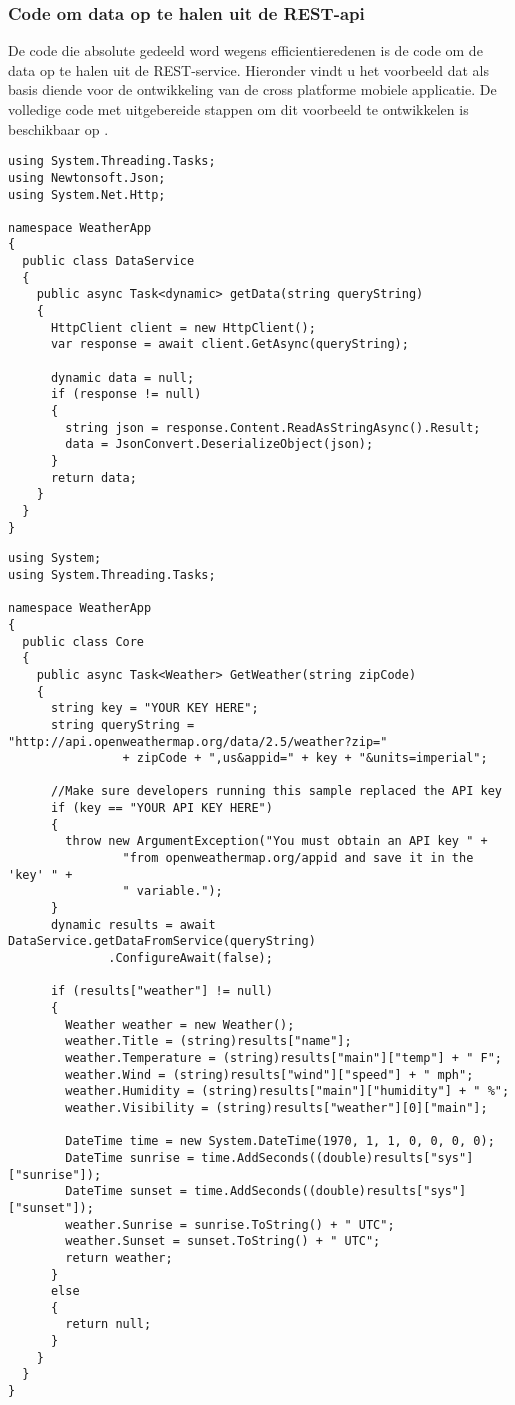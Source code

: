 \subsubsection{Code om data op te halen uit de REST-api}
De code die absolute gedeeld word wegens efficientieredenen is de code om de data op te halen uit de REST-service.
Hieronder vindt u het voorbeeld dat als basis diende voor de ontwikkeling van de cross platforme mobiele applicatie.
De volledige code met uitgebereide stappen om dit voorbeeld te ontwikkelen is beschikbaar op \citep{buildappwithnativeuiusingxamarininvisualstudio}.

\begin{lstlisting}
using System.Threading.Tasks;
using Newtonsoft.Json;
using System.Net.Http;

namespace WeatherApp
{
  public class DataService
  {
    public async Task<dynamic> getData(string queryString)
    {
      HttpClient client = new HttpClient();
      var response = await client.GetAsync(queryString);

      dynamic data = null;
      if (response != null)
      {
        string json = response.Content.ReadAsStringAsync().Result;
        data = JsonConvert.DeserializeObject(json);
      }
      return data;
    }
  }
}

\end{lstlisting}
\begin{lstlisting}
using System;
using System.Threading.Tasks;

namespace WeatherApp
{
  public class Core
  {
    public async Task<Weather> GetWeather(string zipCode)
    {
      string key = "YOUR KEY HERE";
      string queryString = "http://api.openweathermap.org/data/2.5/weather?zip="
                + zipCode + ",us&appid=" + key + "&units=imperial";

      //Make sure developers running this sample replaced the API key
      if (key == "YOUR API KEY HERE")
      {
        throw new ArgumentException("You must obtain an API key " +
                "from openweathermap.org/appid and save it in the 'key' " +
                " variable.");
      }
      dynamic results = await DataService.getDataFromService(queryString)
              .ConfigureAwait(false);

      if (results["weather"] != null)
      {
        Weather weather = new Weather();
        weather.Title = (string)results["name"];
        weather.Temperature = (string)results["main"]["temp"] + " F";
        weather.Wind = (string)results["wind"]["speed"] + " mph";
        weather.Humidity = (string)results["main"]["humidity"] + " %";
        weather.Visibility = (string)results["weather"][0]["main"];

        DateTime time = new System.DateTime(1970, 1, 1, 0, 0, 0, 0);
        DateTime sunrise = time.AddSeconds((double)results["sys"]["sunrise"]);
        DateTime sunset = time.AddSeconds((double)results["sys"]["sunset"]);
        weather.Sunrise = sunrise.ToString() + " UTC";
        weather.Sunset = sunset.ToString() + " UTC";
        return weather;
      }
      else
      {
        return null;
      }
    }
  }
}
\end{lstlisting}

